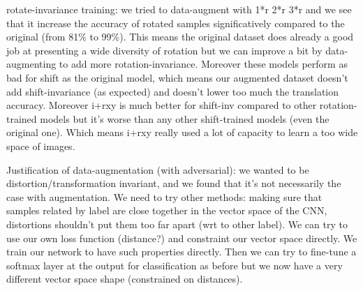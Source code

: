 \documentclass[a4paper,12pt]{article}
\begin{document}
rotate-invariance training: we tried to data-augment with 1*r 2*r 3*r and we see that it increase the accuracy of rotated samples significatively compared to the original (from 81\% to 99\%). This means the original dataset does already a good job at presenting a wide diversity of rotation but we can improve a bit by data-augmenting to add more rotation-invariance.
Moreover these models perform as bad for shift as the original model, which means our augmented dataset doesn't add shift-invariance (as expected) and doesn't lower too much the translation accuracy.
Moreover i+rxy is much better for shift-inv compared to other rotation-trained models but it's worse than any other shift-trained models (even the original one). Which means i+rxy really used a lot of capacity to learn a too wide space of images.

Justification of data-augmentation (with adversarial): we wanted to be distortion/transformation invariant, and we found that it's not necessarily the case with augmentation. We need to try other methods: making sure that samples related by label are close together in the vector space of the CNN, distortions shouldn't put them too far apart (wrt to other label). We can try to use our own loss function (distance?) and constraint our vector space directly.
We train our network to have such properties directly. Then we can try to fine-tune a softmax layer at the output for classification as before but we now have a very different vector space shape (constrained on distances).
\end{document}
